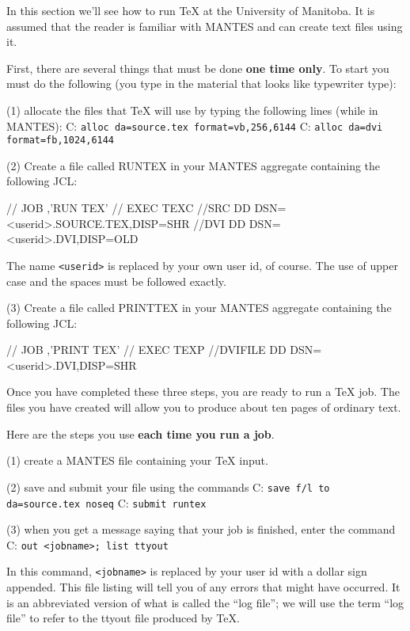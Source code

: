  
In this section we'll see how to run \TeX{} at the University of 
Manitoba.  It is assumed that the reader is familiar with MANTES 
and can create text files using it. 
 
First, there are several things that must be done {\bf one time 
only}. To start you must do the following (you type in the 
material that looks like typewriter type): 
\item{(1)} allocate the files that \TeX{} will use by typing the 
following lines (while in MANTES): 
\itemitem{}  C: {\tt alloc da=source.tex format=vb,256,6144} 
\itemitem{}  C: {\tt alloc da=dvi format=fb,1024,6144} 
 
\item{(2)} Create a file called RUNTEX in your MANTES aggregate 
containing the following JCL: 
 
\beginuser 
//        JOB  ,'RUN TEX' 
//        EXEC TEXC 
//SRC     DD DSN=<userid>.SOURCE.TEX,DISP=SHR 
//DVI     DD DSN=<userid>.DVI,DISP=OLD 
\enduser 
 
 
The name {\tt <userid>} is replaced by your own user id, of 
course. The use of upper case and the spaces must be followed 
exactly. 
 
\item{(3)} Create a file called PRINTTEX in your MANTES aggregate 
containing the following JCL: 
 
\beginuser 
//        JOB  ,'PRINT TEX' 
//        EXEC TEXP 
//DVIFILE DD DSN=<userid>.DVI,DISP=SHR 
\enduser 
 
 
Once you have completed these three steps, you are ready to run a 
\TeX{} job. The files you have created will allow you to produce 
about ten pages of ordinary text. 
 
Here are the steps you use {\bf each time you run a job}. 
 
\item{(1)} create a MANTES file containing your \TeX{} input. 
\item{(2)} save and submit your file using the commands 
\itemitem{} C: {\tt save f/l to da=source.tex noseq} 
\itemitem{} C: {\tt submit runtex} 
\item{(3)} when you get a message saying that your job is finished, 
enter the command 
\itemitem{} C: {\tt out <jobname>; list ttyout} 
 
In this command, {\tt <jobname>} is replaced by your user id with 
a dollar sign appended.  This file listing will tell you of any 
errors that might have occurred.  It is an abbreviated version of 
what is called the ``log file''; we will use the term ``log 
file'' to refer to the ttyout file produced by \TeX\null. 
 
